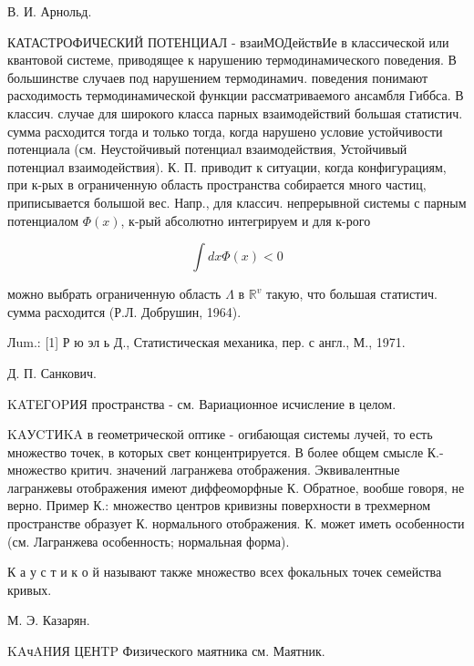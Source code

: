\documentclass[10pt]{article}
\begin{document}
В. И. Арнольд.



КАТАСТРОФИЧЕСКИЙ ПОТЕНЦИАЛ - взаиМОДействИе в классической или квантовой системе, приводящее к нарушению термодинамического поведения. В большинстве случаев под нарушением термодинамич. поведения понимают расходимость термодинамической функции рассматриваемого ансамбля Гиббса. В классич. случае для широкого класса парных взаимодействий большая статистич. сумма расходится тогда и только тогда, когда нарушено условие устойчивости потенциала (см. Неустойчивый потенциал взаимодействия, Устойчивый потенциал взаимодействия). К. П. приводит к ситуации, когда конфигурациям, при к-рых в ограниченную область пространства собирается много частиц, приписывается болышой вес. Напр., для классич. непрерывной системы с парным потенциалом $\Phi(x)$, к-рый абсолютно интегрируем и для к-рого



\[

\int d x \Phi(x)<0

\]



можно выбрать ограниченную область $\Lambda$ в $\mathbb{R}^{v}$ такую, что большая статистич. сумма расходится (Р.Л. Добрушин, 1964).



Лum.: [1] Р ю эл ь Д., Статистическая механика, пер. с англ., М., 1971.



Д. П. Санкович.



KATEГOPИЯ пространства - см. Вариационное исчисление в целом.



KAУCTИKA в геометрической оптике - огибающая системы лучей, то есть множество точек, в которых свет концентрируется. В более общем смысле К.- множество критич. значений лагранжева отображения. Эквивалентные лагранжевы отображения имеют диффеоморфные К. Обратное, вообше говоря, не верно. Пример К.: множество центров кривизны поверхности в трехмерном пространстве образует К. нормального отображения. К. может иметь особенности (см. Лагранжева особенность; нормальная форма).



К а у с т и к о й называют также множество всех фокальных точек семейства кривых.



М. Э. Казарян.



KAчAHИЯ ЦЕНTP Физического маятника см. Маятник.
\end{document}

